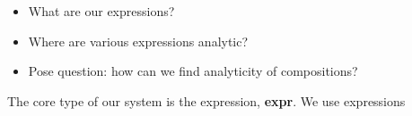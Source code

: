 
\begin{itemize}
  \item What are our expressions?
  \item Where are various expressions analytic?
  \item Pose question: how can we find analyticity of compositions?
\end{itemize}

The core type of our system is the expression, \textbf{expr}. We use
expressions 
